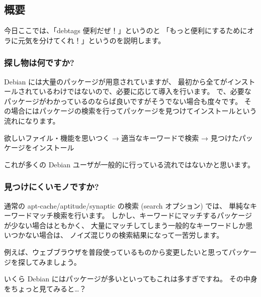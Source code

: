 \documentclass[mingoth,a4paper]{jsarticle}
\begin{document}
\subsection{概要}
今日ここでは、「debtags 便利だぜ！」というのと
「もっと便利にするためにオラに元気を分けてくれ！」というのを説明します。

\subsubsection{探し物は何ですか?}
Debian には大量のパッケージが用意されていますが、
最初から全てがインストールされているわけではないので、必要に応じて導入を行います。
で、必要なパッケージがわかっているのならば良いですがそうでない場合も度々です。
その場合にはパッケージの検索を行ってパッケージを見つけてインストールという流れになります。

欲しいファイル・機能を思いつく
→
適当なキーワードで検索
→
見つけたパッケージをインストール

これが多くの Debian ユーザが一般的に行っている流れではないかと思います。

\subsubsection{見つけにくいモノですか?}

通常の apt-cache/aptitude/synaptic の検索 (search オプション) では、
単純なキーワードマッチ検索を行います。
しかし、キーワードにマッチするパッケージが少ない場合はともかく、
大量にマッチしてしまう一般的なキーワードしか思いつかない場合は、
ノイズ混じりの検索結果になって一苦労します。

例えば、ウェブブラウザを普段使っているものから変更したいと思ってパッケージを探してみましょう。


いくら Debian にはパッケージが多いといってもこれは多すぎですね。
その中身をちょっと見てみると…？
\end{document}
